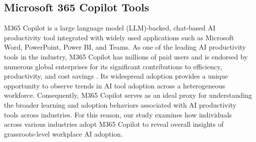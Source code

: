 


\subsection{Microsoft 365 Copilot Tools}
M365 Copilot is a large language model (LLM)-backed, chat-based AI productivity tool integrated with widely used applications such as Microsoft Word, PowerPoint, Power BI, and Teams. As one of the leading AI productivity tools in the industry, M365 Copilot has millions of paid users and is endorsed by numerous global enterprises for its significant contributions to efficiency, productivity, and cost savings \cite{forrester-m365-copilot, althoff2025value}. Its widespread adoption provides a unique opportunity to observe trends in AI tool adoption across a heterogeneous workforce. Consequently, M365 Copilot serves as an ideal proxy for understanding the broader learning and adoption behaviors associated with AI productivity tools across industries. For this reason, our study examines how individuals across various industries adopt M365 Copilot to reveal overall insights of grassroots-level workplace AI adoption.